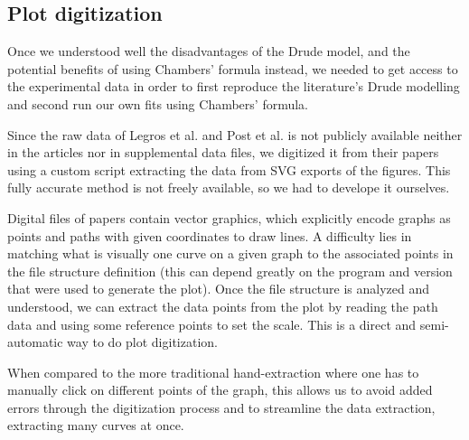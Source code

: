 \subsection{Plot digitization}
Once we understood well the disadvantages of the Drude model, 
and the potential benefits of using Chambers' formula instead, 
we needed to get access to the experimental data in order to 
first reproduce the literature's Drude modelling and 
second run our own fits using Chambers' formula.

Since the raw data of Legros et al. \cite{legros2022} and Post et al. \cite{post2021} is not publicly available neither in the articles nor in supplemental data files, 
we digitized it from their papers using a custom script extracting the data from SVG exports of the figures.
This fully accurate method is not freely available, so we had to develope it ourselves.

Digital files of papers contain vector graphics, 
which explicitly encode graphs as points and paths with given coordinates to draw lines. 
A difficulty lies in matching what is visually one curve on a given graph to the associated points in the file structure definition 
(this can depend greatly on the program and version that were used to generate the plot). 
Once the file structure is analyzed and understood, 
we can extract the data points from the plot by reading the path data and using some reference points to set the scale.
This is a direct and semi-automatic way to do plot digitization.
 
When compared to the more traditional hand-extraction where one has to manually click on different points of the graph, 
this allows us to avoid added errors through the digitization process 
and to streamline the data extraction, extracting many curves at once.
